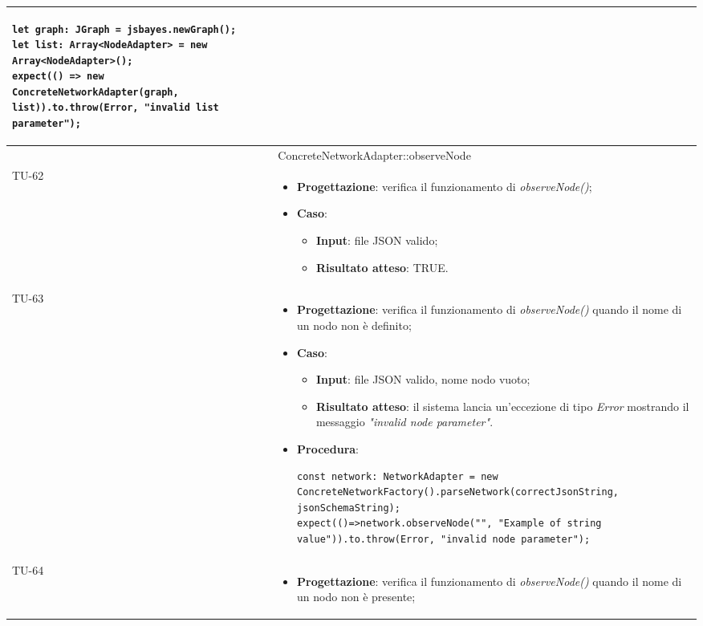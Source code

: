 \begin{longtable}{|C{1.5cm}|C{14.5cm}|}
\begin{itemize}
		\begin{lstlisting}
let graph: JGraph = jsbayes.newGraph();
let list: Array<NodeAdapter> = new Array<NodeAdapter>();
expect(() => new ConcreteNetworkAdapter(graph, list)).to.throw(Error, "invalid list parameter");
		\end{lstlisting}
	\end{itemize}\\
	\hline
{} & ConcreteNetworkAdapter::observeNode
\\ \hline
	{TU-62} &
	\begin{itemize}
		\item \textbf{Progettazione}: verifica il funzionamento di \emph{observeNode()};
		\item \textbf{Caso}: 
		\begin{itemize}
			\item \textbf{Input}: file JSON valido;
			\item \textbf{Risultato atteso}: TRUE.
		\end{itemize}
	\end{itemize}\\
	\hline
	{TU-63} &
	\begin{itemize}
		\item \textbf{Progettazione}: verifica il funzionamento di \emph{observeNode()} quando il nome di un nodo non è definito;
		\item \textbf{Caso}: 
		\begin{itemize}
			\item \textbf{Input}: file JSON valido, nome nodo vuoto;
			\item \textbf{Risultato atteso}: il sistema lancia un'eccezione di tipo \emph{Error} mostrando il messaggio \emph{"invalid node parameter"}.
		\end{itemize}
		\item \textbf{Procedura}:
		\begin{lstlisting}
const network: NetworkAdapter = new ConcreteNetworkFactory().parseNetwork(correctJsonString, jsonSchemaString);
expect(()=>network.observeNode("", "Example of string value")).to.throw(Error, "invalid node parameter");
		\end{lstlisting}
	\end{itemize}\\
	\hline
	{TU-64} &
	\begin{itemize}
		\item \textbf{Progettazione}: verifica il funzionamento di \emph{observeNode()} quando il nome di un nodo non è presente;

\end{itemize}
\end{longtable}
